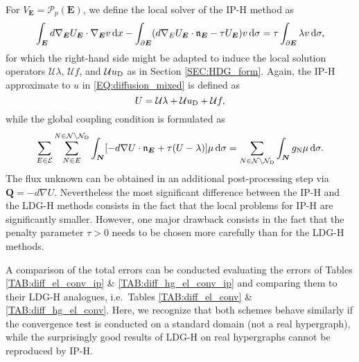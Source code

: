 \documentclass[a4paper, english, 12pt, reqno, draft]{amsart}
\theoremstyle{definition}
\theoremstyle{remark}
\numberwithin{equation}{section}
\newcommand{\setEdge}{\ensuremath{\mathcal E}}
\newcommand{\setNode}{\ensuremath{\mathcal N}}
\newcommand{\setNodeDir}{\ensuremath{\setNode_\textup D}}
\newcommand{\edge}{\ensuremath{E}}
\newcommand{\node}{\ensuremath{N}}
\newcommand{\Edge}{{\ensuremath{\boldsymbol E}}}
\newcommand{\Node}{{\ensuremath{\boldsymbol N}}}
\newcommand{\Normal}{\ensuremath{\mathfrak n_\Edge}}
\newcommand{\polynomials}{\ensuremath{\mathcal P}}
\renewcommand{\vec}[1]{\ensuremath{\boldsymbol{#1}}}
\newcommand{\dx}{\ensuremath{\, \textup d x}}
\newcommand{\ds}{\ensuremath{\, \textup d \sigma}}
\newcommand{\localU}{\ensuremath{\mathcal U}}
\begin{document}
For $V_\Edge = \polynomials_p(\Edge)$, we define the local solver of the IP-H method as
%
\begin{equation}
 \int_\Edge d \nabla_\Edge U_\Edge \cdot \nabla_\Edge v \dx - \int_{\partial \Edge} (d \nabla_\edge U_\Edge \cdot \Normal - \tau U_\Edge ) v \ds = \tau \int_{\partial \Edge} \lambda v \ds,
\end{equation}
% 
for which the right-hand side might be adapted to induce the local solution operators $\localU \lambda$, $\localU f$, and $\localU u_\textup D$ as in Section \ref{SEC:HDG_form}. Again, the IP-H approximate to $u$ in \eqref{EQ:diffusion_mixed} is defined as
%
\begin{equation}
 U = \localU \lambda + \localU u_\textup D + \localU f,
\end{equation}
%
while the global coupling condition is formulated as
%
\begin{equation}
 \sum_{\edge \in \setEdge} \sum^{\node \in \setNode \setminus \setNodeDir}_{\node \in \edge} \int_\Node [ - d \nabla U \cdot \Normal + \tau (U - \lambda) ] \mu \ds = \sum_{\node \in \setNode \setminus \setNodeDir} \int_\Node g_\textup N \mu \ds.
\end{equation}
% 
The flux unknown can be obtained in an additional post-processing step via $\vec Q = - d \nabla U$. Nevertheless the most significant difference between the IP-H and the LDG-H methods consists in the fact that the local problems for IP-H are significantly smaller. However, one major drawback consists in the fact that the penalty parameter $\tau > 0$ needs to be chosen more carefully than for the LDG-H methods.

A comparison of the total errors can be conducted evaluating the errors of Tables \ref{TAB:diff_el_conv_ip} \& \ref{TAB:diff_hg_el_conv_ip} and comparing them to their LDG-H analogues, i.e.\ Tables \ref{TAB:diff_el_conv} \& \ref{TAB:diff_hg_el_conv}. Here, we recognize that both schemes behave similarly if the convergence test is conducted on a standard domain (not a real hypergraph), while the surprisingly good results of LDG-H on real hypergraphs cannot be reproduced by IP-H.
% 
\end{document}
